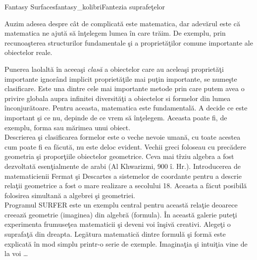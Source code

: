 
\begin{surferIntroPage}{Fantasy Surfaces}{fantasy_kolibri}{Fantezia suprafe\c telor}
 
Auzim adesea despre c\^at de complicat\u a este matematica, dar adev\u arul este c\u a matematica ne ajut\u a
s\u a \^in\c telegem lumea \^in care tr\u aim.
De exemplu, prin recunoa\c sterea structurilor fundamentale \c si a propriet\u a\c tilor comune importante ale
obiectelor reale.

Punerea laolalt\u a \^in aceea\c si \textit{clas\u a} a obiectelor care au acelea\c si propriet\u a\c ti importante
ignor\^and implicit propriet\u a\c tile mai pu\c tin importante, se nume\c ste clasificare.
Este una dintre cele mai importante metode prin care putem avea o privire globala aupra infinitei diversit\u a\c ti
a obiectelor si formelor din lumea \^inconjur\u atoare. Pentru aceasta, matematica este fundamental\u a.
A decide ce este important \c si ce nu, depinde de ce vrem s\u a \^in\c telegem. Aceasta poate fi, de exemplu, forma
sau m\u arimea unui obiect.
\\

\vspace{0.4cm}
Descrierea \c si clasificarea formelor este o veche nevoie uman\u a, cu toate acestea cum poate fi ea f\u acut\u a,
nu este deloc evident. Vechii greci foloseau cu prec\u adere geometria \c si propor\c tiile obiectelor geometrice.
Ceva mai t\^rziu algebra a fost dezvoltat\u a esen\c tialmente de arabi (Al Khwarizmi, 900 \^i. Hr.).
Introducerea de matematicienii Fermat \c si Descartes a sistemelor de coordante pentru a
descrie rela\c tii geometrice a fost o mare realizare a secolului 18. Aceasta a f\u acut posibil\u a folosirea
simultan\u a a algebrei \c si geometriei.
\\

\vspace{0.4cm}
Programul SURFER este un exemplu central pentru aceast\u a rela\c tie deoarece creeaz\u a geometrie (imaginea)
din algebr\u a (formula).
\^In aceast\u a galerie pute\c ti experimenta frumuse\c tea matematicii \c si deveni voi \^in\c siv\u a creativi.
Alege\c ti o suprafa\c t\u a din dreapta. Leg\u atura matematic\u a dintre formul\u a \c si form\u a este
explicat\u a \^in mod simplu printr-o serie de exemple.
Imagina\c tia \c si intui\c tia vine de la voi  \dots

\end{surferIntroPage}